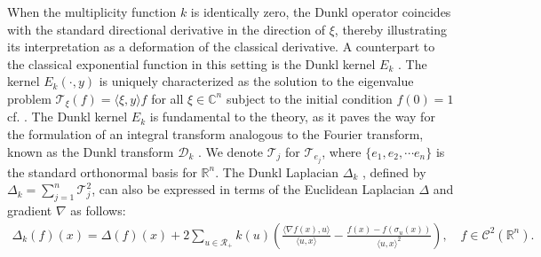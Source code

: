 \documentclass[11pt,a4paper,reqno]{amsproc}
\theoremstyle{definition}
\theoremstyle{remark}
\numberwithin{equation}{section}
\begin{document}
When the multiplicity function $k$ is identically zero, the Dunkl operator coincides with the standard directional derivative in the direction of $\xi$, thereby illustrating its interpretation as a deformation of the classical derivative. A counterpart to the classical exponential function in this setting is the Dunkl kernel $E_k$ \cite{D2}. The kernel $ E_k(\cdot,y)$ is uniquely characterized as the solution to the eigenvalue problem $\mathcal{T}_{\xi}(f)=\langle \xi, y \rangle f$ for all $\xi \in \mathbb{C}^n$ subject to the initial condition $f(0)=1$ cf. \cite{ Opdam}. The Dunkl kernel $E_k$ is fundamental to the theory, as it paves the way for the formulation of an integral transform analogous to the Fourier transform, known as the Dunkl transform $\mathcal{D}_k$ \cite{D3}.  We denote $\mathcal{T}_{j}$ for $\mathcal{T}_{e_j}$, where $\{e_1, e_2, \cdots e_n \}$ is the standard orthonormal basis for $\mathbb{R}^n$. The Dunkl Laplacian $\Delta_k$ \cite{D1}, defined by $\Delta_k= \sum_{j=1}^n \mathcal{T}_j^2$,  can also be expressed in terms of the Euclidean Laplacian  $\Delta$ and gradient $\nabla$ as follows:
\begin{eqnarray*}
    \Delta_k(f)(x) = \Delta (f)(x)+2 \sum _{u \in \mathcal{R}_+} k(u)\left( 
\frac{\langle \nabla f(x),u\rangle }{\langle u,x\rangle} - \frac{f(x)-f(\sigma_u(x))}{\langle u,x\rangle^2}\right), \quad f\in \mathcal{C}^2(\mathbb{R}^n). 
\end{eqnarray*}
\end{document}
